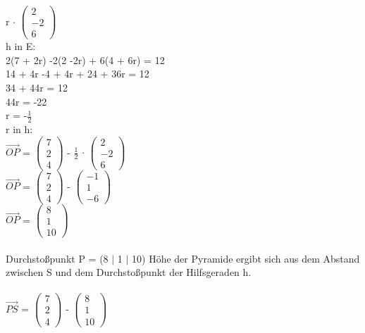 \documentclass{article}
\begin{document}
	r $\cdot$ 
	$\left(\begin{array}{c}
	2 \\ -2 \\ 6
	\end{array}\right)$ \\
	h in E: \\
	2(7 + 2r) -2(2 -2r) + 6(4 + 6r) = 12 \\
	14 + 4r -4 + 4r + 24 + 36r = 12 \\
	34 + 44r = 12 \\
	44r = -22 \\
	r = -$\frac{1}{2}$ \\
	r in h: \\
	$\vec{OP}$ = 
	$\left(\begin{array}{c}
	7 \\ 2 \\ 4
	\end{array}\right)$ - 
	$\frac{1}{2}$ $\cdot$ 
	$\left(\begin{array}{c}
	2 \\ -2 \\ 6
	\end{array}\right)$ \\
	$\vec{OP}$ = 
	$\left(\begin{array}{c}
	7 \\ 2 \\ 4
	\end{array}\right)$ - 
	$\left(\begin{array}{c}
	-1 \\ 1 \\ -6
	\end{array}\right)$ \\
	$\vec{OP}$ = 
	$\left(\begin{array}{c}
	8 \\ 1 \\ 10
	\end{array}\right)$ \\ \\
	Durchstoßpunkt P = (8 $|$ 1 $|$ 10)
	Höhe der Pyramide ergibt sich aus dem Abstand zwischen S und dem Durchstoßpunkt der Hilfsgeraden h. \\ \\
	$\vec{PS}$ = 
	$\left(\begin{array}{c}
	7 \\ 2 \\ 4
	\end{array}\right)$ - 
	$\left(\begin{array}{c}
	8 \\ 1 \\ 10
	\end{array}\right)$ \\
\end{document}
